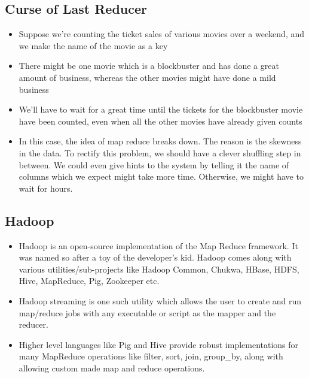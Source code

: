 \documentclass{article}
\begin{document}
\subsection{Curse of Last Reducer}
\begin{itemize}
    \item Suppose we're counting the ticket sales of various movies over a weekend, and we make the name of the movie as a key
    \item There might be one movie which is a blockbuster and has done a great amount of business, whereas the other movies might have done a mild business
    \item We'll have to wait for a great time until the tickets for the blockbuster movie have been counted, even when all the other movies have already given counts
    \item In this case, the idea of map reduce breaks down. The reason is the skewness in the data. To rectify this problem, we should have a clever shuffling step in between. We could even give hints to the system by telling it the name of columns which we expect might take more time. Otherwise, we might have to wait for hours.
\end{itemize}

\subsection{Hadoop}
\begin{itemize}
    \item Hadoop is an open-source implementation of the Map Reduce framework. It was named so after a toy of the developer's kid.
Hadoop comes along with various utilities/sub-projects like Hadoop Common, Chukwa, HBase, HDFS, Hive, MapReduce, Pig, Zookeeper etc.
    \item Hadoop streaming is one such utility which allows the user to create and run map/reduce jobs with any executable or script as the mapper and the reducer.
    \item Higher level languages like Pig and Hive provide robust implementations for many MapReduce operations like filter, sort, join, group\_by, along with allowing custom made map and reduce operations.
\end{itemize}
\end{document}
